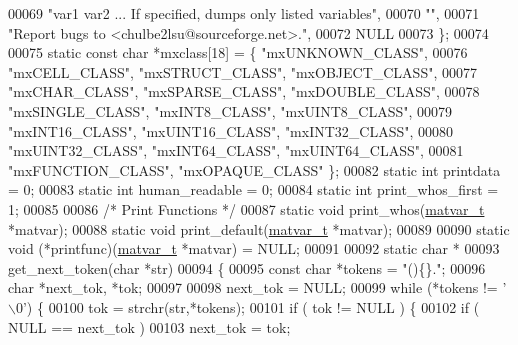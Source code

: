 \begin{DoxyCode}
00069 \textcolor{stringliteral}{"var1 var2 ...     If specified, dumps only listed variables"},
00070 \textcolor{stringliteral}{""},
00071 \textcolor{stringliteral}{"Report bugs to <chulbe2lsu@sourceforge.net>."},
00072 NULL
00073 \};
00074 
00075 \textcolor{keyword}{static} \textcolor{keyword}{const} \textcolor{keywordtype}{char} *mxclass[18] = \{ \textcolor{stringliteral}{"mxUNKNOWN\_CLASS"},
00076     \textcolor{stringliteral}{"mxCELL\_CLASS"}, \textcolor{stringliteral}{"mxSTRUCT\_CLASS"}, \textcolor{stringliteral}{"mxOBJECT\_CLASS"},
00077     \textcolor{stringliteral}{"mxCHAR\_CLASS"}, \textcolor{stringliteral}{"mxSPARSE\_CLASS"}, \textcolor{stringliteral}{"mxDOUBLE\_CLASS"},
00078     \textcolor{stringliteral}{"mxSINGLE\_CLASS"}, \textcolor{stringliteral}{"mxINT8\_CLASS"}, \textcolor{stringliteral}{"mxUINT8\_CLASS"},
00079     \textcolor{stringliteral}{"mxINT16\_CLASS"}, \textcolor{stringliteral}{"mxUINT16\_CLASS"}, \textcolor{stringliteral}{"mxINT32\_CLASS"},
00080     \textcolor{stringliteral}{"mxUINT32\_CLASS"}, \textcolor{stringliteral}{"mxINT64\_CLASS"}, \textcolor{stringliteral}{"mxUINT64\_CLASS"},
00081     \textcolor{stringliteral}{"mxFUNCTION\_CLASS"}, \textcolor{stringliteral}{"mxOPAQUE\_CLASS"} \};
00082 \textcolor{keyword}{static} \textcolor{keywordtype}{int} printdata = 0;
00083 \textcolor{keyword}{static} \textcolor{keywordtype}{int} human\_readable = 0;
00084 \textcolor{keyword}{static} \textcolor{keywordtype}{int} print\_whos\_first = 1;
00085 
00086 \textcolor{comment}{/* Print Functions */}
00087 \textcolor{keyword}{static} \textcolor{keywordtype}{void} print\_whos(\hyperlink{group___m_a_t_structmatvar__t}{matvar\_t} *matvar);
00088 \textcolor{keyword}{static} \textcolor{keywordtype}{void} print\_default(\hyperlink{group___m_a_t_structmatvar__t}{matvar\_t} *matvar);
00089 
00090 \textcolor{keyword}{static} void (*printfunc)(\hyperlink{group___m_a_t_structmatvar__t}{matvar\_t} *matvar) = NULL;
00091 
00092 \textcolor{keyword}{static} \textcolor{keywordtype}{char} *
00093 get\_next\_token(\textcolor{keywordtype}{char} *str)
00094 \{
00095     \textcolor{keyword}{const} \textcolor{keywordtype}{char} *tokens = \textcolor{stringliteral}{"()\{\}."};
00096     \textcolor{keywordtype}{char} *next\_tok, *tok;
00097 
00098     next\_tok = NULL;
00099     \textcolor{keywordflow}{while} (*tokens != \textcolor{charliteral}{'\(\backslash\)0'}) \{
00100         tok   = strchr(str,*tokens);
00101         \textcolor{keywordflow}{if} ( tok != NULL ) \{
00102             \textcolor{keywordflow}{if} ( NULL == next\_tok )
00103                 next\_tok = tok;

\end{DoxyCode}
